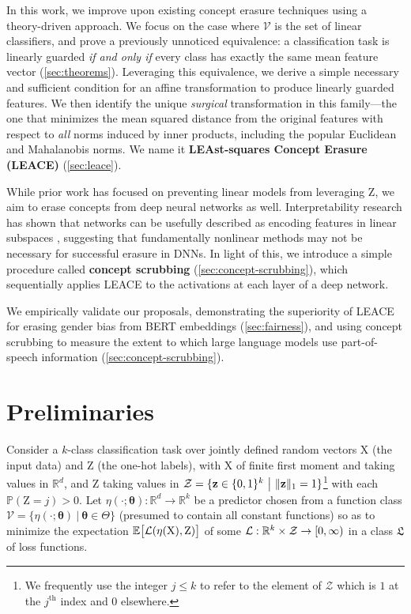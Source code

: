 \documentclass{article}
\theoremstyle{plain}
\theoremstyle{remark}
\newcommand{\vtheta}{{ \boldsymbol \theta}}
\newcommand{\E}{\mathbb E}
\theoremstyle{plain}
\theoremstyle{TheoremNum}
\newcommand{\rv}[1]{{\mathrm{#1}}}
\newcommand{\loss}{\color{black} \mathcal{L}}
\begin{document}
In this work, we improve upon existing concept erasure techniques using a theory-driven approach. We focus on the case where $\mathcal V$ is the set of linear classifiers, and prove a previously unnoticed equivalence: a classification task is linearly guarded \emph{if and only if} every class has exactly the same mean feature vector (\cref{sec:theorems}). Leveraging this equivalence, we derive a simple necessary and sufficient condition for an affine transformation to produce linearly guarded features. We then identify the unique \emph{surgical} transformation in this family---the one that minimizes the mean squared distance from the original features with respect to \emph{all} norms induced by inner products, including the popular Euclidean and Mahalanobis norms. We name it \textbf{LEAst-squares Concept Erasure (LEACE)} (\cref{sec:leace}).

While prior work has focused on preventing linear models from leveraging $\rv Z$, we aim to erase concepts from deep neural networks as well. Interpretability research has shown that networks can be usefully described as encoding features in linear subspaces \cite{elhage2021mathematical, nanda_othello_2023, wu2023interpretability}, suggesting that fundamentally nonlinear methods may not be necessary for successful erasure in DNNs. In light of this, we introduce a simple procedure called \textbf{concept scrubbing} (\cref{sec:concept-scrubbing}), which sequentially applies LEACE to the activations at each layer of a deep network.

We empirically validate our proposals, demonstrating the superiority of LEACE for erasing gender bias from BERT embeddings (\cref{sec:fairness}), and using concept scrubbing to measure the extent to which large language models use part-of-speech information (\cref{sec:concept-scrubbing}).

\section{Preliminaries}\label{sec:preliminaries}

Consider a $k$-class classification task over jointly defined random vectors $\rv X$ (the input data) and $\rv Z$ (the one-hot labels), with $\rv X$ of finite first moment and taking values in $\mathbb R^d$, and $\rv Z$ taking values in $\mathcal Z = \{\mathbf z \in \mathbb \{0, 1\}^k\ \big|\ \|\mathbf z\|_1 = 1\}$\footnote{We frequently use the integer $j \le k$ to refer to the element of $\mathcal Z$ which is $1$ at the $j^\text{th}$ index and $0$ elsewhere.} with each $\mathbb P(\rv Z = j) > 0$. Let $\eta(\cdot; \vtheta): \mathbb R^d \to \mathbb R^k$ be a predictor chosen from a function class $\mathcal V = \{\eta(\cdot; \vtheta)\ |\ \vtheta \in \Theta\}$ (presumed to contain all constant functions) so as to minimize the expectation $\E \big[ \loss(\eta(\rv X), \rv Z) \big]$ of some $\loss: \mathbb R^k \times \mathcal Z \to [0, \infty)$ in a class $\mathfrak L$ of loss functions.
\end{document}

